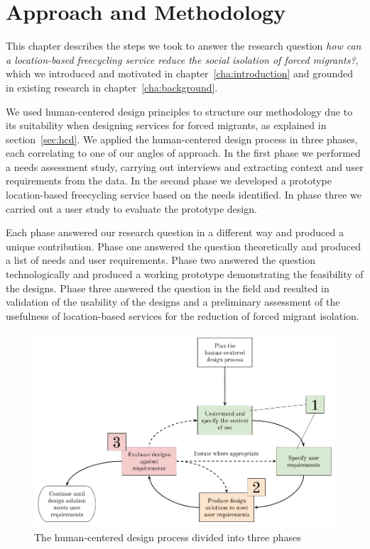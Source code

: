 \chapter{Approach and Methodology}
\label{cha:research_method}

This chapter describes the steps we took to answer the research question \textit{how can a location-based freecycling service reduce the social isolation of forced migrants?}, which we introduced and motivated in chapter~\ref{cha:introduction} and grounded in existing research in chapter~\ref{cha:background}.

We used human-centered design principles to structure our methodology due to its suitability when designing services for forced migrants, as explained in section~\ref{sec:hcd}. We applied the human-centered design process in three phases, each correlating to one of our angles of approach. In the first phase we performed a needs assessment study, carrying out interviews and extracting context and user requirements from the data. In the second phase we developed a prototype location-based freecycling service based on the needs identified. In phase three we carried out a user study to evaluate the prototype design.

Each phase answered our research question in a different way and produced a unique contribution. Phase one answered the question theoretically and produced a list of needs and user requirements. Phase two answered the question technologically and produced a working prototype demonstrating the feasibility of the designs. Phase three answered the question in the field and resulted in validation of the usability of the designs and a preliminary assessment of the usefulness of location-based services for the reduction of forced migrant isolation.

\begin{figure}[ht]
  \includegraphics[width=\textwidth]{images/human_centered_design_flowchart_divided.png}
  \caption{The human-centered design process divided into three phases}
  \label{fig:hcd_divided}
\end{figure}

